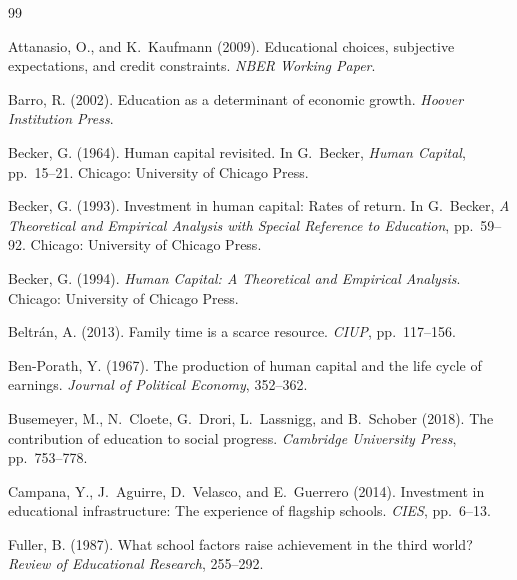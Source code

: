 \documentclass[12pt]{article}
\begin{document}
\newpage

\begin{thebibliography}{99}

Attanasio, O., and K.~Kaufmann (2009).
\newblock Educational choices, subjective expectations, and credit constraints.
\newblock \textit{NBER Working Paper}.

Barro, R. (2002).
\newblock Education as a determinant of economic growth.
\newblock \textit{Hoover Institution Press}.

Becker, G. (1964).
\newblock Human capital revisited.
\newblock In G.~Becker, \textit{Human Capital}, pp.~15--21. Chicago:
  University of Chicago Press.

Becker, G. (1993).
\newblock Investment in human capital: Rates of return.
\newblock In G.~Becker, \textit{A Theoretical and Empirical Analysis with
  Special Reference to Education}, pp.~59--92. Chicago: University of Chicago
  Press.

Becker, G. (1994).
\newblock \textit{Human Capital: A Theoretical and Empirical Analysis}.
\newblock Chicago: University of Chicago Press.

Beltr\'{a}n, A. (2013).
\newblock Family time is a scarce resource.
\newblock \textit{CIUP}, pp.~117--156.

Ben-Porath, Y. (1967).
\newblock The production of human capital and the life cycle of earnings.
\newblock \textit{Journal of Political Economy}, 352--362.

Busemeyer, M., N.~Cloete, G.~Drori, L.~Lassnigg, and B.~Schober (2018).
\newblock The contribution of education to social progress.
\newblock \textit{Cambridge University Press}, pp.~753--778.

Campana, Y., J.~Aguirre, D.~Velasco, and E.~Guerrero (2014).
\newblock Investment in educational infrastructure: The experience of flagship
  schools.
\newblock \textit{CIES}, pp.~6--13.

Fuller, B. (1987).
\newblock What school factors raise achievement in the third world?
\newblock \textit{Review of Educational Research}, 255--292.


\end{thebibliography}
\end{document}
